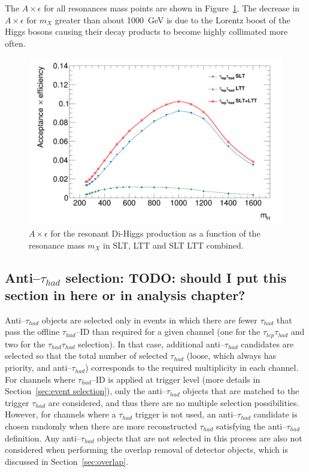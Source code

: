 The $A \times \epsilon$ for all resonances mass points are shown 
in Figure~\ref{fig:selection:acceptances}. 
The decrease in $A \times \epsilon$ 
for $m_X$ greater than about 1000~GeV is due to the Lorentz boost 
of the Higgs bosons causing their decay products to become highly collimated more often.

\begin{figure}[htbp]
\centering
\includegraphics[width=0.85\linewidth]{DiHiggs/plots/FF_CRs/testacc.png}
\caption{$A \times \epsilon$ for the resonant Di-Higgs production
as a function of the resonance mass $m_X$ in
SLT, LTT and SLT LTT combined.}
\label{fig:selection:acceptances}
\end{figure}


\subsection{Anti--$\tau_{had}$ selection: TODO: should I put this section in here or in analysis chapter?}
Anti--$\tau_{had}$ objects are selected only in events 
in which there are fewer $\tau_{had}$ that pass the offline $\tau_{had}$--ID than
required for a given channel (one for the $\tau_{lep}\tau_{had}$ 
and two for the $\tau_{had}$$\tau_{had}$ selection). 
In that case, additional anti--$\tau_{had}$ candidates are selected 
so that the total number of selected $\tau_{had}$ (loose, which always has priority,
and anti--$\tau_{had}$) corresponds to the required multiplicity in each channel.
For channels where $\tau_{had}$--ID is applied at trigger level 
(more details in Section~\ref{sec:event selection}), 
only the anti--$\tau_{had}$ objects that are matched to the
trigger $\tau_{had}$ are considered, and thus there are 
no multiple selection possibilities. 
However, for channels where a $\tau_{had}$ trigger is not used, 
an anti--$\tau_{had}$ candidate is chosen randomly when there are more reconstructed
$\tau_{had}$ satisfying the anti--$\tau_{had}$ definition. 
Any anti--$\tau_{had}$ objects that are not selected in this process are also not
considered when performing the overlap removal of detector objects, 
which is discussed in Section~\ref{sec:overlap}.


